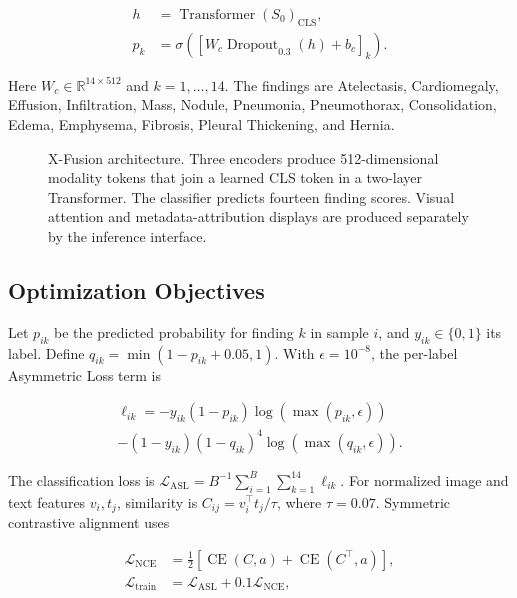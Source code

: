 \documentclass[runningheads,a4paper]{llncs}
\begin{document}
\begin{equation}
\begin{aligned}
h &= \operatorname{Transformer}(S_0)_{\mathrm{CLS}},\\
p_k &= \sigma\!\left(
\left[W_c\operatorname{Dropout}_{0.3}(h)+b_c\right]_k
\right).
\end{aligned}
\end{equation}

Here $W_c\in\mathbb{R}^{14\times512}$ and $k=1,\ldots,14$. The findings are Atelectasis, Cardiomegaly, Effusion, Infiltration, Mass, Nodule, Pneumonia, Pneumothorax, Consolidation, Edema, Emphysema, Fibrosis, Pleural Thickening, and Hernia.

\begin{figure}[t]
\centering
\resizebox{\linewidth}{!}{}
\caption{X-Fusion architecture. Three encoders produce 512-dimensional modality tokens that join a learned CLS token in a two-layer Transformer. The classifier predicts fourteen finding scores. Visual attention and metadata-attribution displays are produced separately by the inference interface.}
\label{fig:architecture}
\end{figure}

\subsection{Optimization Objectives}

Let $p_{ik}$ be the predicted probability for finding $k$ in sample $i$, and $y_{ik}\in\{0,1\}$ its label. Define $q_{ik}=\min(1-p_{ik}+0.05,1)$. With $\epsilon=10^{-8}$, the per-label Asymmetric Loss term is

\begin{multline}
\ell_{ik}=
-y_{ik}(1-p_{ik})
\log(\max(p_{ik},\epsilon))\\
-(1-y_{ik})(1-q_{ik})^4
\log(\max(q_{ik},\epsilon)).
\end{multline}

The classification loss is $\mathcal{L}_{\mathrm{ASL}}=B^{-1}\sum_{i=1}^{B}\sum_{k=1}^{14}\ell_{ik}$. For normalized image and text features $v_i,t_j$, similarity is $C_{ij}=v_i^\top t_j/\tau$, where $\tau=0.07$. Symmetric contrastive alignment uses

\begin{align}
\mathcal{L}_{\mathrm{NCE}}
&=\tfrac{1}{2}
[\operatorname{CE}(C,a)+
\operatorname{CE}(C^\top,a)],\\
\mathcal{L}_{\mathrm{train}}
&=\mathcal{L}_{\mathrm{ASL}}
+0.1\mathcal{L}_{\mathrm{NCE}},
\end{align}
\end{document}
